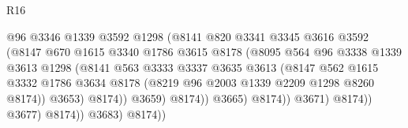 \begin{lexlean}{R16}
\begin{coremodule}
                                          @96
                                          @3346
                                          @1339
                                          @3592
                                          @1298
                                          (@8141
                                            @820
                                            @3341
                                            @3345
                                            @3616
                                            @3592
                                            (@8147
                                              @670
                                              @1615
                                              @3340
                                              @1786
                                              @3615
                                              @8178
                                              (@8095
                                                @564
                                                @96
                                                @3338
                                                @1339
                                                @3613
                                                @1298
                                                (@8141
                                                  @563
                                                  @3333
                                                  @3337
                                                  @3635
                                                  @3613
                                                  (@8147
                                                    @562
                                                    @1615
                                                    @3332
                                                    @1786
                                                    @3634
                                                    @8178
                                                    (@8219 @96 @2003 @1339 @2209 @1298 @8260 @8174))
                                                  @3653)
                                                @8174))
                                            @3659)
                                          @8174))
                                      @3665)
                                    @8174))
                                @3671)
                              @8174))
                          @3677)
                        @8174))
                    @3683)
                  @8174))

\end{coremodule}
\end{lexlean}
